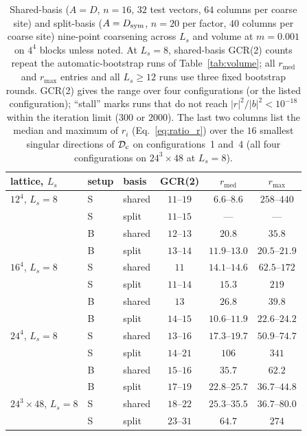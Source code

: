 \begin{table}[t]
\centering
\caption{\New Shared-basis ($A=D$, $n=16$, $32$ test vectors, $64$ columns per coarse site) and
split-basis ($A=D_{\mathrm{sym}}$, $n=20$ per factor, $40$ columns per coarse site) nine-point coarsening
across $L_s$ and volume at $m=0.001$ on $4^4$ blocks unless noted. At $L_s=8$, shared-basis GCR(2)
counts repeat the automatic-bootstrap runs of Table~\ref{tab:volume}; all $r_{\mathrm{med}}$ and
$r_{\max}$ entries and all $L_s\ge12$ runs use three fixed bootstrap rounds. GCR(2) gives the range
over four configurations (or the listed configuration); ``stall'' marks runs that do not reach
$|r|^2/|b|^2<10^{-18}$ within the iteration limit ($300$ or $2000$). The last two columns list the
median and maximum of $r_i$ (Eq.~\eqref{eq:ratio_r}) over the $16$ smallest singular directions of
$\mathcal D_{\mathrm c}$ on configurations~1 and~4 (all four configurations on $24^3\times48$ at $L_s=8$).}
\label{tab:ls16comp}
\footnotesize
\renewcommand{\arraystretch}{1.08}
\setlength{\tabcolsep}{6pt}
\begin{tabular}{@{}lllccc@{}}
\toprule
lattice, $L_s$ & setup & basis & GCR(2) & $r_{\mathrm{med}}$ & $r_{\max}$\\
\midrule
$12^4$, $L_s=8$ & S & shared & $11$--$19$ & $6.6$--$8.6$ & $258$--$440$\\
 & S & split & $11$--$15$ & --- & ---\\
 & B & shared & $12$--$13$ & $20.8$ & $35.8$\\
 & B & split & $13$--$14$ & $11.9$--$13.0$ & $20.5$--$21.9$\\
\addlinespace[2pt]
$16^4$, $L_s=8$ & S & shared & $11$ & $14.1$--$14.6$ & $62.5$--$172$\\
 & S & split & $11$--$14$ & $15.3$ & $219$\\
 & B & shared & $13$ & $26.8$ & $39.8$\\
 & B & split & $14$--$15$ & $10.6$--$11.9$ & $22.6$--$24.2$\\
\addlinespace[2pt]
$24^4$, $L_s=8$ & S & shared & $13$--$16$ & $17.3$--$19.7$ & $50.9$--$74.7$\\
 & S & split & $14$--$21$ & $106$ & $341$\\
 & B & shared & $15$--$16$ & $35.7$ & $62.2$\\
 & B & split & $17$--$19$ & $22.8$--$25.7$ & $36.7$--$44.8$\\
\addlinespace[2pt]
$24^3\times48$, $L_s=8$ & S & shared & $18$--$22$ & $25.3$--$35.5$ & $36.7$--$80.0$\\
 & S & split & $23$--$31$ & $64.7$ & $274$\\

\end{tabular}
\end{table}

